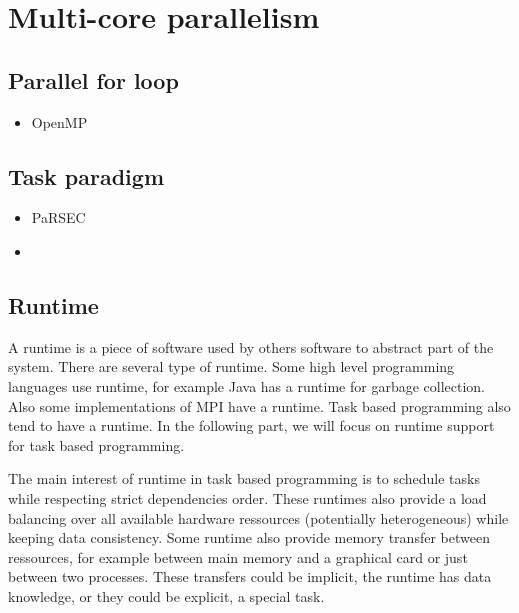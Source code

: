 \section{Multi-core parallelism}
\subsection{Parallel for loop}
  \begin{itemize}
    \item OpenMP
  \end{itemize}
\subsection{Task paradigm}
  \begin{itemize}
    \item PaRSEC
    \item
  \end{itemize}


\subsection{Runtime}
A runtime is a piece of software used by others software to abstract part of the system.
%
There are several type of runtime.
%
Some high level programming languages use runtime, for example Java has a runtime for garbage collection.
%
Also some implementations of MPI have a runtime.
%
Task based programming also tend to have a runtime.
%
In the following part, we will focus on runtime support for task based programming.



The main interest of runtime in task based programming is to schedule tasks while respecting strict dependencies order.
%
These runtimes also provide a load balancing over all available hardware ressources (potentially heterogeneous) while keeping data consistency.
%
Some runtime also provide memory transfer between ressources, for example between main memory and a graphical card or just between two processes.
%
These transfers could be implicit, the runtime has data knowledge, or they could be explicit, a special task.


